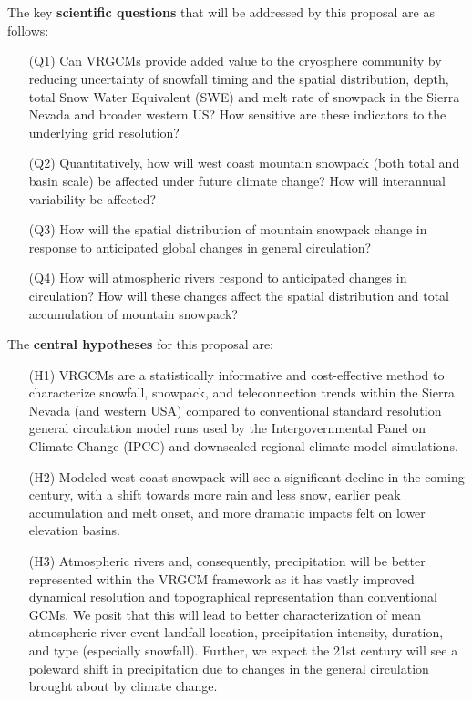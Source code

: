 \documentclass[11pt]{article}
\begin{document}
\\\\
The key \textbf{scientific questions} that will be addressed by this proposal are as follows:

\vspace{-0.4cm}
\begin{itemize}
\item[(Q1)] Can VRGCMs provide added value to the cryosphere community by reducing uncertainty of  snowfall timing and the spatial distribution, depth, total Snow Water Equivalent (SWE) and melt rate of snowpack in the Sierra Nevada and broader western US?  How sensitive are these indicators to the underlying grid resolution?

\item[(Q2)] Quantitatively, how will west coast mountain snowpack (both total and basin scale) be affected under future climate change?  How will interannual variability be affected?

\item[(Q3)] How will the spatial distribution of mountain snowpack change in response to anticipated global changes in general circulation?

\item[(Q4)] How will atmospheric rivers respond to anticipated changes in circulation?  How will these changes affect the spatial distribution and total accumulation of mountain snowpack?
\end{itemize}

\noindent The \textbf{central hypotheses} for this proposal are:

\vspace{-0.4cm}
\begin{itemize}
\item[(H1)] VRGCMs are a statistically informative and cost-effective method to characterize snowfall, snowpack, and teleconnection trends within the Sierra Nevada (and western USA) compared to conventional standard resolution general circulation model runs used by the Intergovernmental Panel on Climate Change (IPCC) and downscaled regional climate model simulations.
\item[(H2)] Modeled west coast snowpack will see a significant decline in the coming century, with a shift towards more rain and less snow, earlier peak accumulation and melt onset, and more dramatic impacts felt on lower elevation basins.
\item[(H3)] Atmospheric rivers and, consequently, precipitation will be better represented within the VRGCM framework as it has vastly improved dynamical resolution and topographical representation than conventional GCMs.  We posit that this will lead to better characterization of mean atmospheric river event landfall location, precipitation intensity, duration, and type (especially snowfall).  Further, we expect the 21st century will see a poleward shift in precipitation due to changes in the general circulation brought about by climate change.  
\end{itemize}
\end{document}
